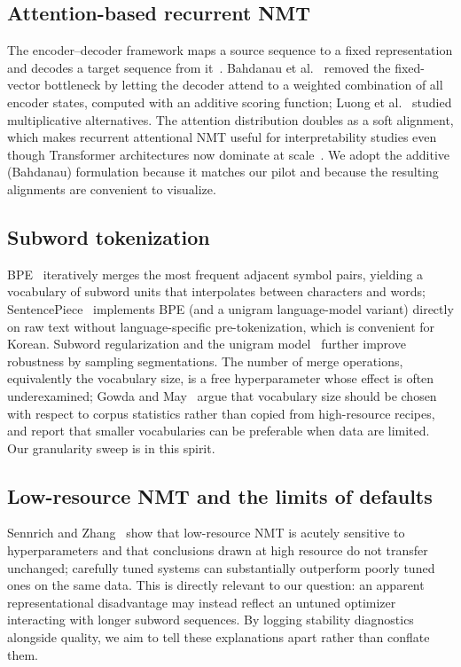 \documentclass[conference]{IEEEtran}
\begin{document}
\subsection{Attention-based recurrent NMT}
The encoder--decoder framework maps a source sequence to a fixed
representation and decodes a target sequence from it~\cite{sutskever2014,
cho2014}. Bahdanau et al.~\cite{bahdanau2015} removed the fixed-vector
bottleneck by letting the decoder attend to a weighted combination of all
encoder states, computed with an additive scoring function; Luong et
al.~\cite{luong2015} studied multiplicative alternatives. The attention
distribution doubles as a soft alignment, which makes recurrent attentional NMT
useful for interpretability studies even though Transformer architectures now
dominate at scale~\cite{vaswani2017}. We adopt the additive (Bahdanau)
formulation because it matches our pilot and because the resulting alignments
are convenient to visualize.

\subsection{Subword tokenization}
BPE~\cite{sennrich2016} iteratively merges the most frequent adjacent symbol
pairs, yielding a vocabulary of subword units that interpolates between
characters and words; SentencePiece~\cite{kudo2018spm} implements BPE (and a
unigram language-model variant) directly on raw text without language-specific
pre-tokenization, which is convenient for Korean. Subword regularization and the
unigram model~\cite{kudo2018subword} further improve robustness by sampling
segmentations. The number of merge operations, equivalently the vocabulary size,
is a free hyperparameter whose effect is often underexamined; Gowda and
May~\cite{gowda2020} argue that vocabulary size should be chosen with respect to
corpus statistics rather than copied from high-resource recipes, and report that
smaller vocabularies can be preferable when data are limited. Our granularity
sweep is in this spirit.

\subsection{Low-resource NMT and the limits of defaults}
Sennrich and Zhang~\cite{sennrich2019} show that low-resource NMT is acutely
sensitive to hyperparameters and that conclusions drawn at high resource do not
transfer unchanged; carefully tuned systems can substantially outperform
poorly tuned ones on the same data. This is directly relevant to our question:
an apparent representational disadvantage may instead reflect an untuned
optimizer interacting with longer subword sequences. By logging stability
diagnostics alongside quality, we aim to tell these explanations apart rather
than conflate them.
\end{document}
